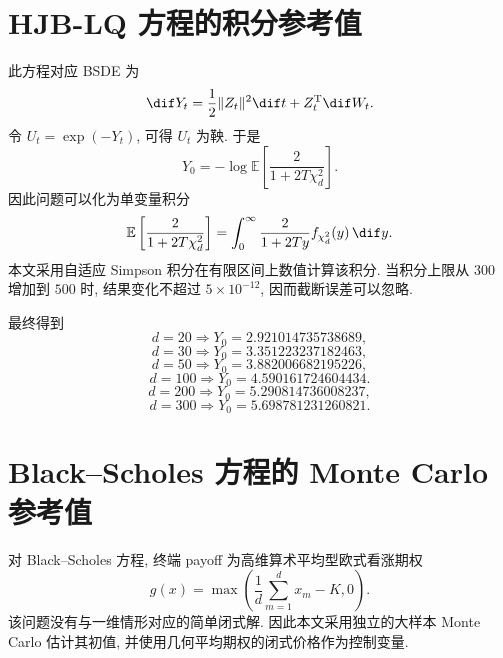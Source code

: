   \section{HJB-LQ 方程的积分参考值}\label{sec:ref_hjb}
    此方程对应 BSDE 为
    \begin{equation}
      \dif Y_t=\frac{1}{2}\lVert Z_t\rVert^2\dif t+Z_t^{\operatorname{T}}\dif W_t.
      \label{eq:numerical_hjblq_bsde}
    \end{equation}
    令 $U_t=\exp(-Y_t)$, 可得 $U_t$ 为鞅.
    于是
    \begin{equation}
      Y_0
      =
      -\log
      \mathbb{E}
      \left[
        \frac{2}{1+2T\chi_d^2}
      \right].
    \end{equation}
    因此问题可以化为单变量积分
    \begin{equation}
      \mathbb{E}
      \left[
        \frac{2}{1+2T\chi_d^2}
      \right]
      =
      \int_{0}^{\infty}
      \frac{2}{1+2Ty} f_{\chi_d^2}(y)\,\dif y.
    \end{equation}
    本文采用自适应 Simpson 积分在有限区间上数值计算该积分.
    当积分上限从 $300$ 增加到 $500$ 时, 结果变化不超过 $5\times 10^{-12}$,
    因而截断误差可以忽略.

    最终得到
    \begin{equation}
      d=20 \Rightarrow Y_0=2.921014735738689,
    \end{equation}
    \begin{equation}
      d=30 \Rightarrow Y_0=3.351223237182463,
    \end{equation}
    \begin{equation}
      d=50 \Rightarrow Y_0=3.882006682195226,
    \end{equation}
    \begin{equation}
      d=100 \Rightarrow Y_0=4.590161724604434.
    \end{equation}
    \begin{equation}
      d=200 \Rightarrow Y_0=5.290814736008237,
    \end{equation}
    \begin{equation}
      d=300 \Rightarrow Y_0=5.698781231260821.
    \end{equation}

  \section{Black--Scholes 方程的 Monte Carlo 参考值}\label{sec:ref_bsm}
    对 Black--Scholes 方程, 终端 payoff 为高维算术平均型欧式看涨期权
    \begin{equation}
      g(x)=\max\!\left(\frac{1}{d}\sum_{m=1}^{d}x_m-K,0\right).
    \end{equation}
    该问题没有与一维情形对应的简单闭式解.
    因此本文采用独立的大样本 Monte Carlo 估计其初值,
    并使用几何平均期权的闭式价格作为控制变量.

